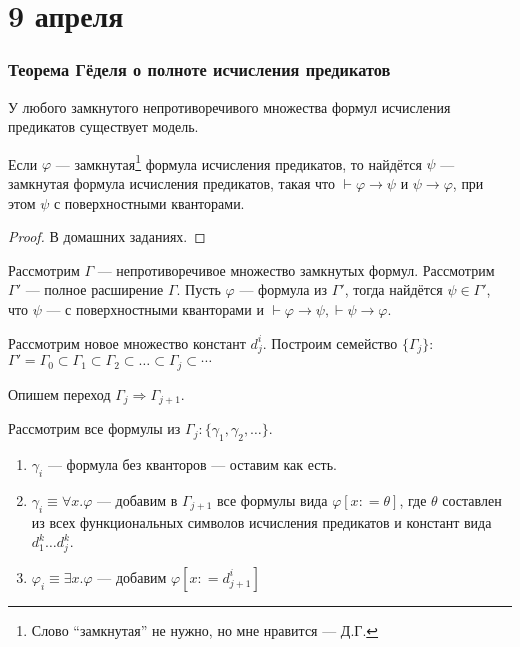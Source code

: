 \chapter{9 апреля}

\subsection{Теорема Гёделя о полноте исчисления предикатов}

\begin{theorem}
    У любого замкнутого непротиворечивого множества формул исчисления предикатов существует модель.
\end{theorem}

\begin{theorem}
    Если \(\varphi\) --- замкнутая\footnote{Слово ``замкнутая'' не нужно, но мне нравится --- Д.Г.} формула исчисления предикатов, то найдётся \(\psi\) --- замкнутая формула исчисления предикатов, такая что \(\vdash \varphi \to \psi\) и \(\psi \to \varphi\), при этом \(\psi\) с поверхностными кванторами.
\end{theorem}
\begin{proof}
    В домашних заданиях.
\end{proof}

Рассмотрим \(\Gamma\) --- непротиворечивое множество замкнутых формул. Рассмотрим \(\Gamma'\) --- полное расширение \(\Gamma\). Пусть \(\varphi\) --- формула из \(\Gamma'\), тогда найдётся \(\psi \in \Gamma'\), что \(\psi\) --- с поверхностными кванторами и \(\vdash \varphi \to \psi, \vdash \psi \to \varphi\).

Рассмотрим новое множество констант \(d_j^i\). Построим семейство \(\{\Gamma_j\}\): \(\Gamma' = \Gamma_0 \subset \Gamma_1 \subset \Gamma_2 \subset \dots \subset \Gamma_j \subset \cdots\)

Опишем переход \(\Gamma_j \Rightarrow \Gamma_{j + 1}\).

Рассмотрим все формулы из \(\Gamma_j : \{\gamma_1, \gamma_2, \dots\}\).
\begin{enumerate}
    \item \(\gamma_i\) --- формула без кванторов --- оставим как есть.
    \item \(\gamma_i \equiv \forall x.\varphi\) --- добавим в \(\Gamma_{j + 1}\) все формулы вида \(\varphi[x: = \theta]\), где \(\theta\) составлен из всех функциональных символов исчисления предикатов и констант вида \(d_1^k \dots d_j^k\).
    \item \(\varphi_i \equiv \exists x.\varphi\) --- добавим \(\varphi[x: = d^i_{j + 1}]\)
\end{enumerate}

